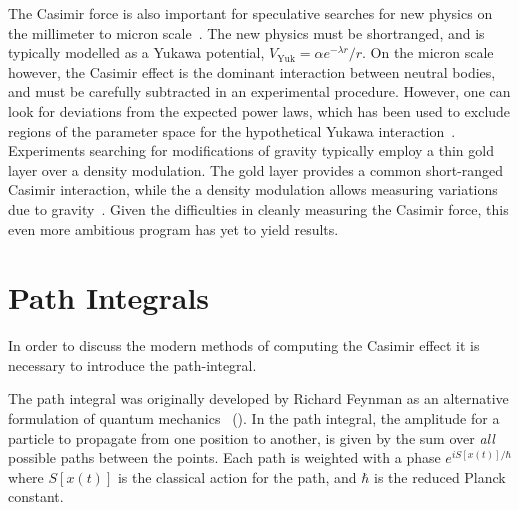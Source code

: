 The Casimir force is also important for speculative searches for new physics on the millimeter to micron
scale~\cite{Dimopoulos2003, Bezerra2011}.  The new physics must be shortranged, and is typically modelled as 
a Yukawa potential, $V_{\text{Yuk}}=\alpha e^{-\lambda r}/r$.  
On the micron scale however, the Casimir effect is the dominant interaction between neutral bodies,
 and must be carefully subtracted in an experimental procedure.
 However, one can look for deviations from the expected 
power laws, which has been used to exclude regions of the parameter space for the hypothetical
Yukawa interaction~\cite{Lamoreaux1997,Obrecht2007,Bezerra2011}.  
Experiments searching for modifications of gravity typically employ a thin gold layer over
a density modulation.  The gold layer provides a common short-ranged Casimir interaction, while the 
a density modulation allows measuring variations due to gravity~\cite{Sorrentino2009, Geraci2015}.
Given the difficulties in cleanly measuring the Casimir force, this even more ambitious program has yet 
to yield results.  



\section{Path Integrals}

In order to discuss the modern methods of computing the Casimir effect it is necessary to introduce
the path-integral.

The path integral was originally developed by Richard Feynman as an alternative formulation of quantum mechanics
~(\cite{Feynman1948,Feynman1965}).  
In the path integral, the amplitude for a particle to propagate from one position to another,
is given by the sum over \emph{all} possible paths between the points.  
Each path is weighted with a phase $e^{iS[x(t)]/\hbar}$ where $S[x(t)]$ is the classical action for the path,
and $\hbar$ is the reduced Planck constant.   

